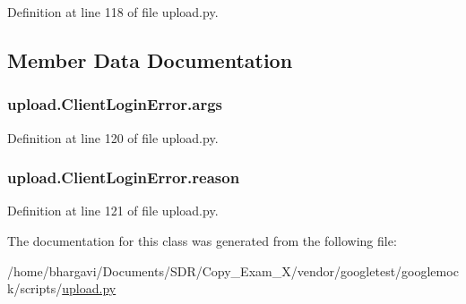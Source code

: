 Definition at line 118 of file upload.\+py.



\subsection{Member Data Documentation}
\subsubsection[{\texorpdfstring{args}{args}}]{\setlength{\rightskip}{0pt plus 5cm}upload.\+Client\+Login\+Error.\+args}\hypertarget{classupload_1_1_client_login_error_ac300a0b034b2bc64cedc51e09fb6d663}{}\label{classupload_1_1_client_login_error_ac300a0b034b2bc64cedc51e09fb6d663}


Definition at line 120 of file upload.\+py.

\subsubsection[{\texorpdfstring{reason}{reason}}]{\setlength{\rightskip}{0pt plus 5cm}upload.\+Client\+Login\+Error.\+reason}\hypertarget{classupload_1_1_client_login_error_ae0555feb182d89d1e4d7944afbfe14e5}{}\label{classupload_1_1_client_login_error_ae0555feb182d89d1e4d7944afbfe14e5}


Definition at line 121 of file upload.\+py.



The documentation for this class was generated from the following file\+:\begin{DoxyCompactItemize}
\item 
/home/bhargavi/\+Documents/\+S\+D\+R/\+Copy\+\_\+\+Exam\+\_\+X/vendor/googletest/googlemock/scripts/\hyperlink{googlemock_2scripts_2upload_8py}{upload.\+py}\end{DoxyCompactItemize}
